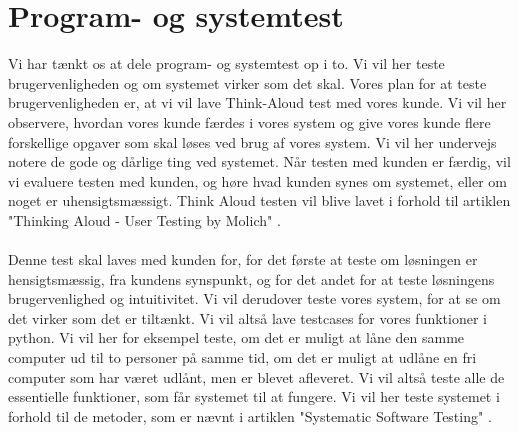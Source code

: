 \documentclass[a4paper]{article}
\begin{document}
\section{Program- og systemtest}
Vi har tænkt os at dele program- og systemtest op i to. Vi vil her teste brugervenligheden og om systemet virker som det skal. Vores plan for at teste brugervenligheden er, at vi vil lave Think-Aloud test med vores kunde. Vi vil her observere, hvordan vores kunde færdes i vores system og give vores kunde flere forskellige opgaver som skal løses ved brug af vores system. Vi vil her undervejs notere de gode og dårlige ting ved systemet. Når testen med kunden er færdig, vil vi evaluere testen med kunden, og høre hvad kunden synes om systemet, eller om noget er uhensigtsmæssigt. Think Aloud testen vil blive lavet i forhold til artiklen "Thinking Aloud - User Testing by Molich" \cite{ThinkAloud}. \\ \\
Denne test skal laves med kunden for, for det første at teste om løsningen er hensigtsmæssig, fra kundens synspunkt, og for det andet for at teste løsningens brugervenlighed og intuitivitet. 
Vi vil derudover teste vores system, for at se om det virker som det er tiltænkt. Vi vil altså lave testcases for vores funktioner i python. Vi vil her for eksempel teste, om det er muligt at låne den samme computer ud til to personer på samme tid, om det er muligt at udlåne en fri computer som har været udlånt, men er blevet afleveret. Vi vil altså teste alle de essentielle funktioner, som får systemet til at fungere. Vi vil her teste systemet i forhold til de metoder, som er nævnt i artiklen "Systematic Software Testing" \cite{SoftwareTest}.
\end{document}
